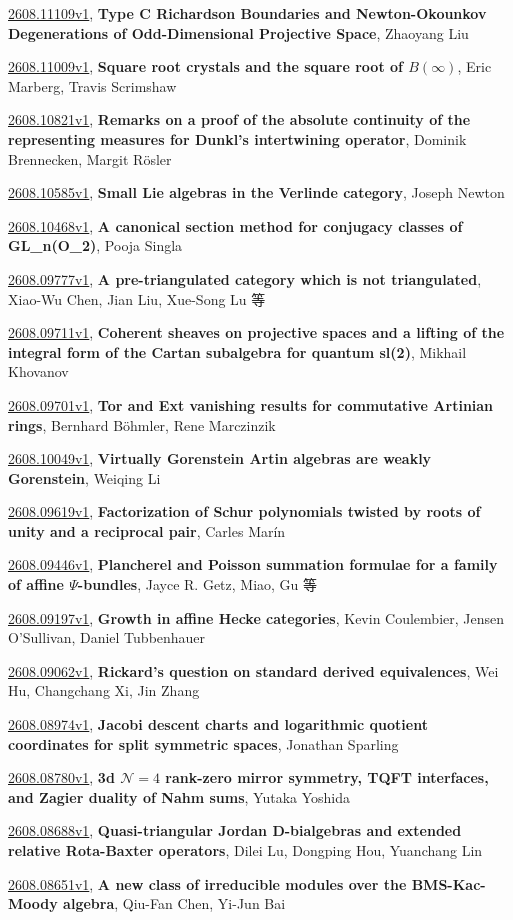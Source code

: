 \documentclass[9pt, a4paper]{article}
\theoremstyle{plain}
\theoremstyle{definition}
\theoremstyle{remark}
\newcommand{\arxiv}[3]{\href{https://arxiv.org/abs/#1}{#1}, \textbf{\textcolor{arxivblue}{#2}}, #3}
\begin{document}
\arxiv{2608.11109v1}{Type C Richardson Boundaries and Newton-Okounkov Degenerations of Odd-Dimensional Projective Space}{Zhaoyang Liu}

\arxiv{2608.11009v1}{Square root crystals and the square root of $B(\infty)$}{Eric Marberg, Travis Scrimshaw}

\arxiv{2608.10821v1}{Remarks on a proof of the absolute continuity of the representing measures for Dunkl's intertwining operator}{Dominik Brennecken, Margit Rösler}

\arxiv{2608.10585v1}{Small Lie algebras in the Verlinde category}{Joseph Newton}

\arxiv{2608.10468v1}{A canonical section method for conjugacy classes of GL_n(O_2)}{Pooja Singla}

\arxiv{2608.09777v1}{A pre-triangulated category which is not triangulated}{Xiao-Wu Chen, Jian Liu, Xue-Song Lu 等}

\arxiv{2608.09711v1}{Coherent sheaves on projective spaces and a lifting of the integral form of the Cartan subalgebra for quantum sl(2)}{Mikhail Khovanov}

\arxiv{2608.09701v1}{Tor and Ext vanishing results for commutative Artinian rings}{Bernhard Böhmler, Rene Marczinzik}

\arxiv{2608.10049v1}{Virtually Gorenstein Artin algebras are weakly Gorenstein}{Weiqing Li}

\arxiv{2608.09619v1}{Factorization of Schur polynomials twisted by roots of unity and a reciprocal pair}{Carles Marín}

\arxiv{2608.09446v1}{Plancherel and Poisson summation formulae for a family of affine $Ψ$-bundles}{Jayce R. Getz,  Miao,  Gu 等}

\arxiv{2608.09197v1}{Growth in affine Hecke categories}{Kevin Coulembier, Jensen O'Sullivan, Daniel Tubbenhauer}

\arxiv{2608.09062v1}{Rickard's question on standard derived equivalences}{Wei Hu, Changchang Xi, Jin Zhang}

\arxiv{2608.08974v1}{Jacobi descent charts and logarithmic quotient coordinates for split symmetric spaces}{Jonathan Sparling}

\arxiv{2608.08780v1}{3d $\mathcal N=4$ rank-zero mirror symmetry, TQFT interfaces, and Zagier duality of Nahm sums}{Yutaka Yoshida}

\arxiv{2608.08688v1}{Quasi-triangular Jordan D-bialgebras and extended relative Rota-Baxter operators}{Dilei Lu, Dongping Hou, Yuanchang Lin}

\arxiv{2608.08651v1}{A new class of irreducible modules over the BMS-Kac-Moody algebra}{Qiu-Fan Chen, Yi-Jun Bai}
\end{document}
